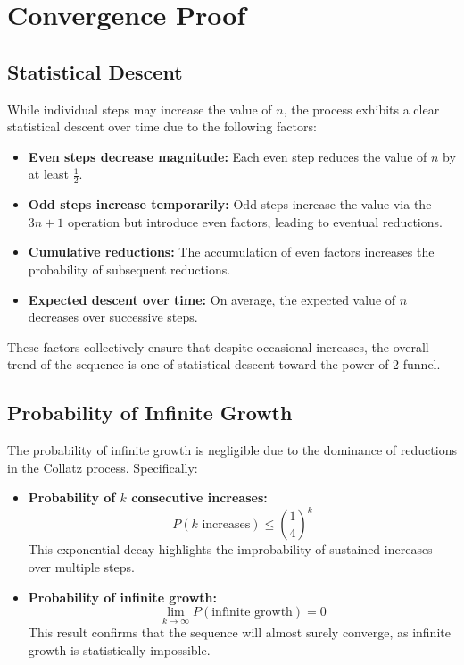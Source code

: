 \section{Convergence Proof}

\subsection{Statistical Descent}
While individual steps may increase the value of \( n \), the process exhibits a clear statistical descent over time due to the following factors:
\begin{itemize}
    \item \textbf{Even steps decrease magnitude:} Each even step reduces the value of \( n \) by at least \( \frac{1}{2} \).
    \item \textbf{Odd steps increase temporarily:} Odd steps increase the value via the \( 3n+1 \) operation but introduce even factors, leading to eventual reductions.
    \item \textbf{Cumulative reductions:} The accumulation of even factors increases the probability of subsequent reductions.
    \item \textbf{Expected descent over time:} On average, the expected value of \( n \) decreases over successive steps.
\end{itemize}
These factors collectively ensure that despite occasional increases, the overall trend of the sequence is one of statistical descent toward the power-of-2 funnel.

\subsection{Probability of Infinite Growth}
The probability of infinite growth is negligible due to the dominance of reductions in the Collatz process. Specifically:
\begin{itemize}
    \item \textbf{Probability of \( k \) consecutive increases:}
    \[
    P(k \text{ increases}) \leq \left(\frac{1}{4}\right)^k
    \]
    This exponential decay highlights the improbability of sustained increases over multiple steps.
    \item \textbf{Probability of infinite growth:}
    \[
    \lim_{k \to \infty} P(\text{infinite growth}) = 0
    \]
    This result confirms that the sequence will almost surely converge, as infinite growth is statistically impossible.
\end{itemize}

